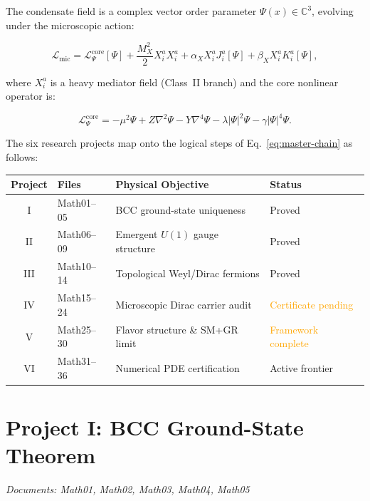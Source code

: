 \documentclass[reprint,aps,pre,onecolumn,superscriptaddress,amsmath,amssymb]{revtex4-2}
\newcommand{\Psifield}{\Psi(x)\in\mathbb{C}^{3}}
\begin{document}
The condensate field is a complex vector order parameter
$\Psifield$, evolving under the microscopic action:

\begin{equation}
  \mathcal{L}_{\mathrm{mic}}
  =
  \mathcal{L}_{\Psi}^{\mathrm{core}}[\Psi]
  + \frac{M_{X}^{2}}{2}X_{i}^{a}X_{i}^{a}
  + \alpha_{X} X_{i}^{a} J_{i}^{a}[\Psi]
  + \beta_{X}  X_{i}^{a} K_{i}^{a}[\Psi],
  \label{eq:mic-action}
\end{equation}

where $X_{i}^{a}$ is a heavy mediator field (Class~II branch) and the core
nonlinear operator is:

\begin{equation}
  \mathcal{L}_{\Psi}^{\mathrm{core}}
  =
  -\mu^{2}\Psi + Z\nabla^{2}\Psi - Y\nabla^{4}\Psi
  - \lambda|\Psi|^{2}\Psi - \gamma|\Psi|^{4}\Psi.
  \label{eq:core-op}
\end{equation}

The six research projects map onto the logical steps of
Eq.~\eqref{eq:master-chain} as follows:

\begin{center}
\renewcommand{\arraystretch}{1.4}
\begin{tabular}{clll}
\toprule
\textbf{Project} & \textbf{Files} & \textbf{Physical Objective} & \textbf{Status} \\
\midrule
I   & Math01--05 & BCC ground-state uniqueness      & \textcolor{green!60!black}{Proved} \\
II  & Math06--09 & Emergent $U(1)$ gauge structure   & \textcolor{green!60!black}{Proved} \\
III & Math10--14 & Topological Weyl/Dirac fermions   & \textcolor{green!60!black}{Proved} \\
IV  & Math15--24 & Microscopic Dirac carrier audit   & \textcolor{orange}{Certificate pending} \\
V   & Math25--30 & Flavor structure \& SM+GR limit   & \textcolor{orange}{Framework complete} \\
VI  & Math31--36 & Numerical PDE certification       & \textcolor{red!70!black}{Active frontier} \\
\bottomrule
\end{tabular}
\end{center}

\section{Project I: BCC Ground-State Theorem}
\label{sec:proj1}
\textit{Documents: Math01, Math02, Math03, Math04, Math05}
\end{document}
